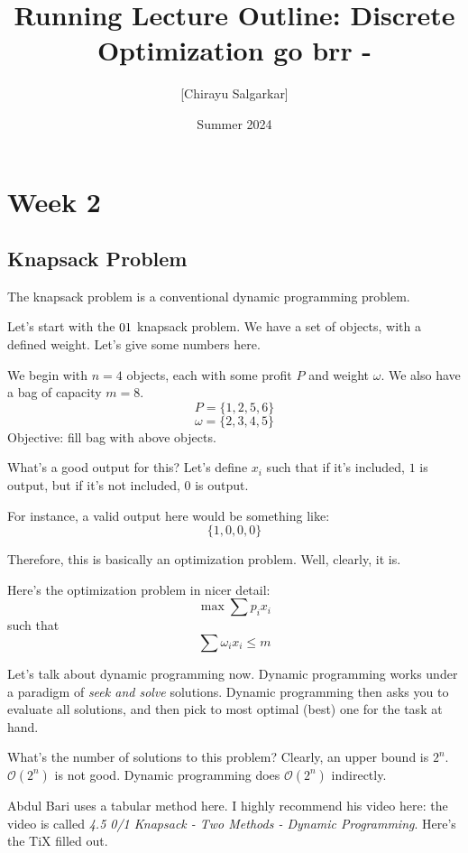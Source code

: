 \documentclass[10pt, oneside]{article}
\title{Running Lecture Outline: Discrete Optimization go brr -}
\author{[Chirayu Salgarkar]}
\date{Summer 2024}
\begin{document}
\maketitle
\tableofcontents

\vspace{.25in}

\section{Week 2}

\subsection{Knapsack Problem}

The knapsack problem is a conventional dynamic programming problem. 

Let's start with the $0 \/ 1$ knapsack problem. We have a set of objects, with a defined weight. Let's give some numbers here.

We begin with $n = 4$ objects, each with some profit $P$ and weight $\omega$. We also have a bag of capacity $m = 8$.
\[ P = \{1, 2, 5, 6\}\]
\[ \omega = \{2, 3, 4, 5\} \]
Objective: fill bag with above objects. 

What's a good output for this? Let's define $x_i$ such that if it's included, $1$ is output, but if it's not included, $0$ is output. 

For instance, a valid output here would be something like:
\[ \{1, 0, 0, 0\} \]

Therefore, this is basically an optimization problem. Well, clearly, it is. 

Here's the optimization problem in nicer detail: 
\[ \max \sum p_ix_i\]
such that
\[ \sum \omega_ix_i \leq m \]

Let's talk about dynamic programming now. 
Dynamic programming works under a paradigm of \textit{seek and solve} solutions. Dynamic programming then asks you to evaluate all solutions, and then pick to most optimal (best) one for the task at hand.

What's the number of solutions to this problem? Clearly, an upper bound is $2^n$. 
$\mathcal{O}(2^n)$ is not good. Dynamic programming does $\mathcal{O}(2^n)$ indirectly. 

Abdul Bari uses a tabular method here. I highly recommend his video here: the video is called \textit{4.5 0/1 Knapsack - Two Methods - Dynamic Programming}. Here's the TiX filled out. 
\end{document}

